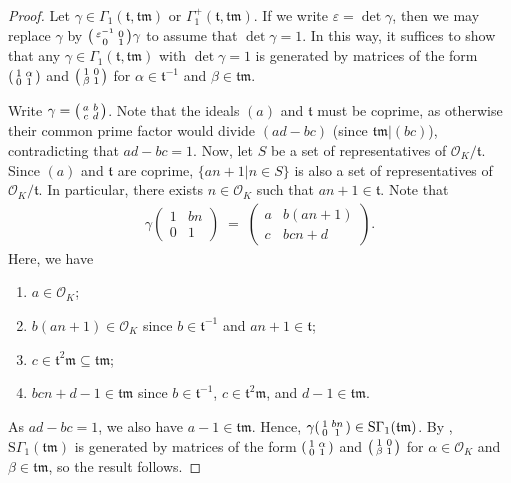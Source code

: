 \documentclass[11pt]{amsart}
\theoremstyle{remark}
\newcommand\m[1]{\begin{pmatrix}#1\end{pmatrix}}
\newcommand\sm[1]{\begin{psmallmatrix}#1\end{psmallmatrix}}
\newcommand\fr[1]{\mathfrak{#1}}
\newcommand{\eps}{\varepsilon}
\newcommand{\clo}{\mathcal{O}}
\newcommand{\eq}{\;=\;}
\newcommand{\SG}{\mathrm{S}\Gamma}
\begin{document}
\begin{proof}
Let $\gamma\in\Gamma_1(\fr{t},\fr{tm})$ or $\Gamma_1^+(\fr{t},\fr{tm})$. If we write $\eps=\det\gamma$, then we may replace $\gamma$ by $\sm{\eps^{-1}&0\\0&1}\gamma$ to assume that $\det\gamma=1$. In this way, it suffices to show that any $\gamma\in\Gamma_1(\fr{t},\fr{tm})$ with $\det\gamma=1$ is generated by matrices of the form $\sm{1&\alpha\\0&1}$ and $\sm{1&0\\\beta&1}$ for $\alpha\in\fr{t}^{-1}$ and $\beta\in\fr{tm}$.

Write $\gamma=\sm{a&b\\c&d}$. Note that the ideals $(a)$ and $\fr{t}$ must be coprime, as otherwise their common prime factor would divide $(ad-bc)$ (since $\fr{tm}|(bc)$), contradicting that $ad-bc=1$. Now, let $S$ be a set of representatives of $\clo_K/\fr{t}$. Since $(a)$ and $\fr{t}$ are coprime, $\{an+1|n\in S\}$ is also a set of representatives of $\clo_K/\fr{t}$. In particular, there exists $n\in\clo_K$ such that $an+1\in\fr{t}$. Note that
\begin{align*}
    \gamma\m{1&bn\\0&1}\eq\m{a&b(an+1)\\c&bcn+d}.
\end{align*}
Here, we have
\begin{enumerate}[label=(\arabic*)]
    \item $a\in\clo_K$;
    \item $b(an+1)\in\clo_K$ since $b\in\fr{t}^{-1}$ and $an+1\in\fr{t}$;
    \item $c\in\fr{t}^2\fr{m}\subseteq\fr{tm}$;
    \item $bcn+d-1\in\fr{tm}$ since $b\in\fr{t}^{-1}$, $c\in\fr{t}^2\fr{m}$, and $d-1\in\fr{tm}$.
\end{enumerate}
As $ad-bc=1$, we also have $a-1\in\fr{tm}$. Hence, $\gamma\sm{1&bn\\0&1}\in\SG_1(\fr{tm})$. By , $\SG_1(\fr{tm})$ is generated by matrices of the form $\sm{1&\alpha\\0&1}$ and $\sm{1&0\\\beta&1}$ for $\alpha\in\clo_K$ and $\beta\in\fr{tm}$, so the result follows.
\end{proof}
\end{document}
